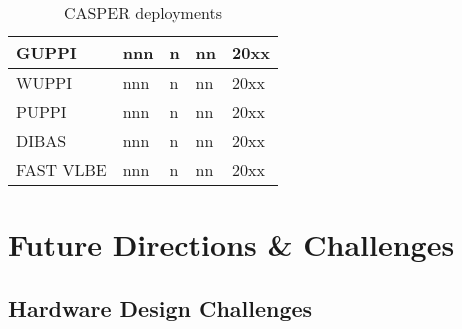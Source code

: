\documentclass{ws-jai}
\begin{document}
\begin{table}
\begin{center}
\begin{tabulary}{0.8\textwidth}{LLLLL}
\hline 
GUPPI                                                          &
nnn                                                            & 
n                                                              & 
nn                                                             &
20xx                                                           \\

\hline 
WUPPI                                                          &
nnn                                                            & 
n                                                              & 
nn                                                             &
20xx                                                           \\

\hline 
PUPPI                                                          &
nnn                                                            & 
n                                                              & 
nn                                                             &
20xx                                                           \\

\hline 
DIBAS                                                          &
nnn                                                            & 
n                                                              & 
nn                                                             &
20xx                                                           \\

\hline 
FAST VLBE                                                      &
nnn                                                            & 
n                                                              & 
nn                                                             &
20xx                                                           \\

\hline \hline
\end{tabulary}
\caption{CASPER deployments}
\end{center}
\end{table}


\section{Future Directions \& Challenges} \label{sec:Future}

\subsection{Hardware Design Challenges}
\end{document}

